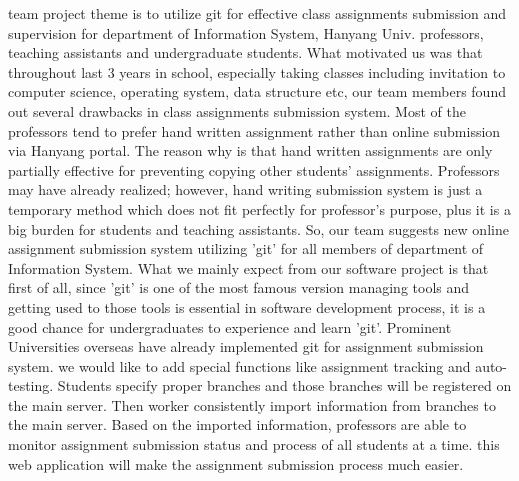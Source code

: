 \documentclass[10pt,journal,compsoc]{IEEEtran}
\begin{document}
% 
% 
% 
% 
 team project theme is to utilize git for effective class assignments submission and supervision for department of Information System, Hanyang Univ. professors, teaching assistants and undergraduate students. What motivated us was that throughout last 3 years in school, especially taking classes including invitation to computer science, operating system, data structure etc, our team members found out several drawbacks in class assignments submission system. Most of the professors tend to prefer hand written assignment rather than online submission via Hanyang portal. The reason why is that hand written assignments are only partially effective for preventing copying other students' assignments. Professors may have already realized; however, hand writing submission system is just a temporary method which does not fit perfectly for professor's purpose, plus it is a big burden for students and teaching assistants. So, our team suggests new online assignment submission system utilizing 'git' for all members of department of Information System. What we mainly expect from our software project is that first of all, since 'git' is one of the most famous version managing tools and getting used to those tools is essential in software development process, it is a good chance for undergraduates to experience and learn 'git'. Prominent Universities overseas have already implemented git for assignment submission system. we would like to add special functions like assignment tracking and auto-testing. Students specify proper branches and those branches will be registered on the main server. Then worker consistently import information from branches to the main server. Based on the imported information, professors are able to monitor assignment submission status and process of all students at a time. this web application will make the assignment submission process much easier.\\
\end{document}
